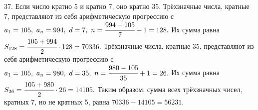 37. Если число кратно 5 и кратно 7, оно кратно 35. Трёхзначные числа, кратные 7, представляют из себя арифметическую прогрессию с $a_1=105,\ a_n=994,\ d=7,\ n=\cfrac{994-105}{7}+1=128.$ Их сумма равна $S_{128}=\cfrac{105+994}{2}\cdot128=70336.$ Трёхзначные числа, кратные 35, представляют из себя арифметическую прогрессию с $a_1=105,\ a_n=980,\ d=35,\ n=\cfrac{980-105}{35}+1=26.$ Их сумма равна $S_{26}=\cfrac{105+980}{2}\cdot26=14105.$ Таким образом, сумма всех трёхзначных чисел, кратных 7, но не кратных 5, равна $70336-14105=56231.$\\
